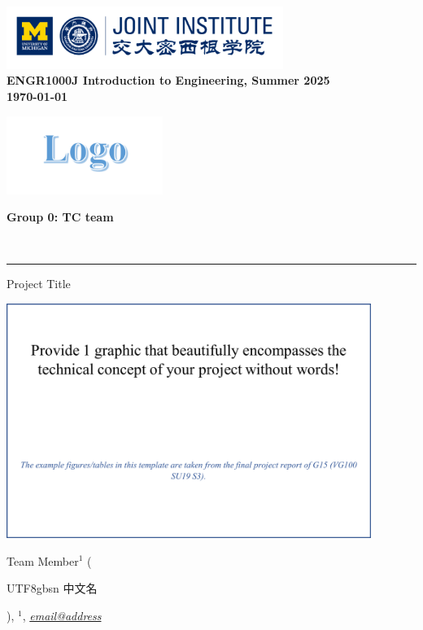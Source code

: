 \documentclass[10pt]{article}
\begin{document}
  \thispagestyle{firstpage}
  \includegraphics[height=0.8in]{figures/headlogo.png}
  \\ \textbf{\Large ENGR1000J Introduction to Engineering, Summer 2025}\\[0.5em]
  \textbf{{\Large \today}}\\[1em]
  \begin{center}
    \begin{minipage}{0.45\textwidth}
      \centering
      \includegraphics[height=1in]{figures/team logo.png}
    \end{minipage}\hfill
    \begin{minipage}{0.45\textwidth}
      \textbf{\Large Group 0: TC team}
    \end{minipage}\\[1em]
  \end{center}

  \noindent
  {\color{gray!30}\rule{\textwidth}{0.1pt}}

  {\Huge Project Title}

  {\includegraphics[height=3in]{figures/preface_picture.png}}

  Team Member${}^{1}$ (\begin{CJK}
    {UTF8}{gbsn} 中文名
  \end{CJK}), ${}^{1}$, \textit{\underline {email@address}}
\end{document}
